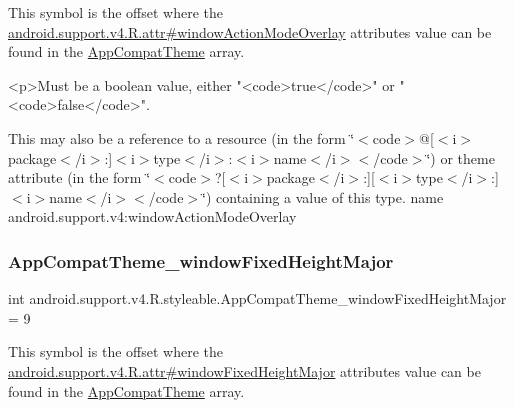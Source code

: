 This symbol is the offset where the \hyperlink{classandroid_1_1support_1_1v4_1_1R_1_1attr_addc952329a9579398057228fff4e4326}{android.\+support.\+v4.\+R.\+attr\#window\+Action\+Mode\+Overlay} attribute\textquotesingle{}s value can be found in the \hyperlink{classandroid_1_1support_1_1v4_1_1R_1_1styleable_ac07ebbe62ed977f6dcaadc6397840ace}{App\+Compat\+Theme} array.

\begin{DoxyVerb}      <p>Must be a boolean value, either "<code>true</code>" or "<code>false</code>".
\end{DoxyVerb}
 

This may also be a reference to a resource (in the form \char`\"{}$<$code$>$@\mbox{[}$<$i$>$package$<$/i$>$\+:\mbox{]}$<$i$>$type$<$/i$>$\+:$<$i$>$name$<$/i$>$$<$/code$>$\char`\"{}) or theme attribute (in the form \char`\"{}$<$code$>$?\mbox{[}$<$i$>$package$<$/i$>$\+:\mbox{]}\mbox{[}$<$i$>$type$<$/i$>$\+:\mbox{]}$<$i$>$name$<$/i$>$$<$/code$>$\char`\"{}) containing a value of this type.  name android.\+support.\+v4\+:window\+Action\+Mode\+Overlay \mbox{\label{classandroid_1_1support_1_1v4_1_1R_1_1styleable_aaa685f805f4181374a8047b1ce8935b5}} 
\subsubsection{\texorpdfstring{App\+Compat\+Theme\+\_\+window\+Fixed\+Height\+Major}{AppCompatTheme\_windowFixedHeightMajor}}
{\footnotesize\ttfamily int android.\+support.\+v4.\+R.\+styleable.\+App\+Compat\+Theme\+\_\+window\+Fixed\+Height\+Major = 9\hspace{0.3cm}{\ttfamily [static]}}

This symbol is the offset where the \hyperlink{classandroid_1_1support_1_1v4_1_1R_1_1attr_a8a7cdfacf627f6189a625fc5a284b096}{android.\+support.\+v4.\+R.\+attr\#window\+Fixed\+Height\+Major} attribute\textquotesingle{}s value can be found in the \hyperlink{classandroid_1_1support_1_1v4_1_1R_1_1styleable_ac07ebbe62ed977f6dcaadc6397840ace}{App\+Compat\+Theme} array.

